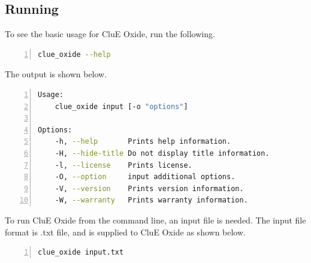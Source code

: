 \documentclass{book}
\begin{document}
\subsection{Running}
To see the basic usage for CluE Oxide, run the following.
\begin{lstlisting}[frame=single,numbers=left,language=bash]
clue_oxide --help
\end{lstlisting}
The output is shown below.
\begin{lstlisting}[frame=single,numbers=left,language=bash]
Usage:
    clue_oxide input [-o "options"]

Options:
    -h, --help       Prints help information.
    -H, --hide-title Do not display title information.
    -l, --license    Prints license.
    -O, --option     input additional options.
    -V, --version    Prints version information.
    -W, --warranty   Prints warranty information.
\end{lstlisting}
To run CluE Oxide from the command line, an input file is needed.
The input file format is .txt file, and is supplied to CluE Oxide as shown below. 
\begin{lstlisting}[frame=single,numbers=left,language=bash]
clue_oxide input.txt
\end{lstlisting}
\end{document}
